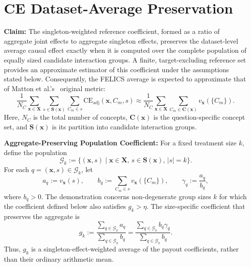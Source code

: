 \section*{CE Dataset-Average Preservation}
\begin{math_box}[label=ma:dataset_average_preservation]
    \textbf{Claim:} The singleton-weighted reference coefficient, formed as a
    ratio of aggregate joint effects to aggregate singleton effects, preserves the dataset-level average causal effect
    exactly when it is computed over the complete population of equally sized
    candidate interaction groups. A finite, target-excluding reference set provides an approximate
    estimator of this coefficient under the assumptions stated below. Consequently,
    the FELICS average is expected to approximate that of Matton et
    al.'s~\cite{mattonWalkTalkMeasuring2024} original metric:
    \begin{equation}
        \frac{1}{N_C}
        \sum_{\mathbf{x}\in\mathbf{X}}
        \sum_{s\in\mathbf{S}(\mathbf{x})}
        \sum_{C_m\in s}
        \mathrm{CE}_{\mathrm{adj}}(\mathbf{x},C_m,s)
        \approx
        \frac{1}{N_C}
        \sum_{\mathbf{x}\in\mathbf{X}}
        \sum_{C_m\in\mathbf{C}(\mathbf{x})}
        v_{\mathbf{x}}(\{C_m\}).
    \end{equation}
    Here, $N_C$ is the total number of concepts, $\mathbf{C}(\mathbf{x})$
    is the question-specific concept set, and $\mathbf{S}(\mathbf{x})$ is its
    partition into candidate interaction groups.

    \smallskip
    \textbf{Aggregate-Preserving Population Coefficient:} For a fixed treatment
    size $k$, define the population
    \begin{equation}
        \mathcal{G}_k
        :=
        \{(\mathbf{x},s)\mid \mathbf{x}\in\mathbf{X},\,
        s\in\mathbf{S}(\mathbf{x}),\,|s|=k\}.
    \end{equation}
    For each $q=(\mathbf{x},s)\in\mathcal{G}_k$, let
    \begin{equation}
        a_q:=v_{\mathbf{x}}(s),
        \qquad
        b_q:=\sum_{C_m\in s}v_{\mathbf{x}}(\{C_m\}),
        \qquad
        \gamma_q:=\frac{a_q}{b_q},
    \end{equation}
    where $b_q>0$. The demonstration concerns non-degenerate group sizes $k$ for
    which the coefficient defined below also satisfies $g_k>\eta$. The
    size-specific coefficient that preserves the aggregate is
    \begin{equation}
        \label{eq:aggregate_preserving_gamma}
        g_k
        :=
        \frac{\sum_{q\in\mathcal{G}_k}a_q}
             {\sum_{q\in\mathcal{G}_k}b_q}
        =
        \frac{\sum_{q\in\mathcal{G}_k}b_q\gamma_q}
             {\sum_{q\in\mathcal{G}_k}b_q}.
    \end{equation}
    Thus, $g_k$ is a singleton-effect-weighted average of the payout
    coefficients, rather than their ordinary arithmetic mean.


\end{math_box}
